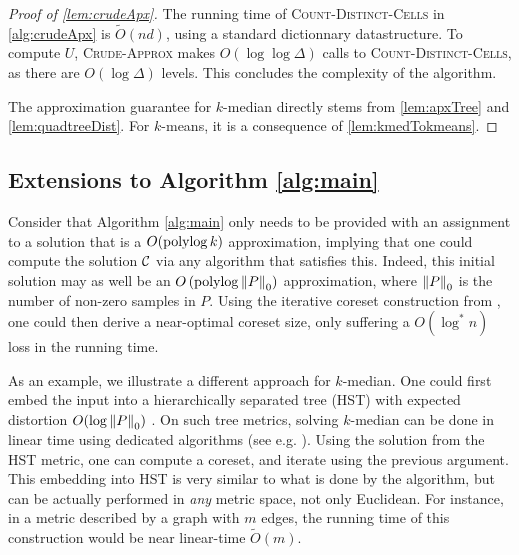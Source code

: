 \begin{proof}[Proof of \cref{lem:crudeApx}]
The running time of \textsc{Count-Distinct-Cells} in \cref{alg:crudeApx} is $\tilde O(nd)$, using a standard dictionnary datastructure. To compute $U$,
\textsc{Crude-Approx} makes $O(\log \log \Delta)$ calls to \textsc{Count-Distinct-Cells}, as there are $O(\log \Delta)$ levels. This concludes the complexity of
the algorithm.

The approximation guarantee for $k$-median directly stems from \cref{lem:apxTree} and \cref{lem:quadtreeDist}. For $k$-means, it is a consequence of \cref{lem:kmedTokmeans}.
\end{proof}


\subsection{Extensions to Algorithm \ref{alg:main}}
\label{app:extensions}

Consider that Algorithm \ref{alg:main} only needs to be provided with an assignment to a solution that is a $O(\operatorname{polylog} k)$ approximation, implying that one
could compute the solution $\mathcal C$ via any algorithm that satisfies this.  Indeed, this initial solution may as well be an $O\left(\operatorname{polylog} \left\| P \right\|_0 \right)$
approximation, where $\left\| P \right\|_0$ is the number of non-zero samples in $P$. Using the iterative coreset construction from \cite{BravermanJKW21}, one could
then derive a near-optimal coreset size, only suffering a $O(\log^* n)$ loss in the running time.

As an example, we illustrate a different approach for $k$-median. One could first embed the input into a hierarchically separated tree (HST) with expected
distortion $O(\log \left\| P \right\|_0)$ \cite{FakcharoenpholRT03}. On such tree metrics, solving $k$-median can be done in linear time using dedicated algorithms
(see e.g. \cite{Cohen-AddadLNSS21}). Using the solution from the HST metric, one can compute a coreset, and iterate using the previous argument.  This embedding
into HST is very similar to what is done by the \fkmeans algorithm, but can be actually performed in \emph{any} metric space, not only Euclidean.  For instance,
in a metric described by a graph with $m$ edges, the running time of this construction would be near linear-time $\tilde O(m)$.

